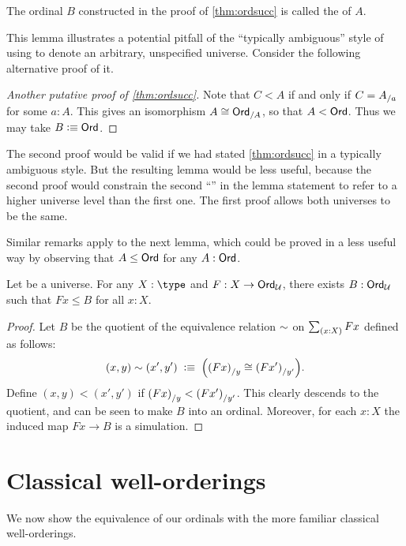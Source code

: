 The ordinal $B$ constructed in the proof of \cref{thm:ordsucc} is called the  of $A$.

This lemma illustrates a potential pitfall of the ``typically ambiguous'' style of using \UU to denote an arbitrary, unspecified universe.
Consider the following alternative proof of it.

\begin{proof}[Another putative proof of \cref{thm:ordsucc}]
  Note that $C<A$ if and only if $C={A}_{/a}$ for some $a:A$.
  This gives an isomorphism $A \cong {\ensuremath{\mathsf{Ord}}}_{/A}$, so that $A<\mathsf{Ord}$.
  Thus we may take $B\vcentcolon\equiv\mathsf{Ord}$.
\end{proof}

The second proof would be valid if we had stated \cref{thm:ordsucc} in a typically ambiguous style.
But the resulting lemma would be less useful, because the second proof would constrain the second ``\ord'' in the lemma statement to refer to a higher universe level than the first one.
The first proof allows both universes to be the same.

Similar remarks apply to the next lemma, which could be proved in a less useful way by observing that $A\le \mathsf{Ord}$ for any $A:\mathsf{Ord}$.

\begin{lem}\label{thm:ordunion}
  Let \bbU be a universe.
  For any $X:\type$ and $F:X\to \mathsf{Ord}_\mathcal{U}$, there exists $B:\mathsf{Ord}_\mathcal{U}$ such that $Fx\le B$ for all $x:X$.
\end{lem}
\begin{proof}
  Let $B$ be the quotient of the equivalence relation $\sim$ on $\sm{x:X} Fx$ defined as follows:
  \[ (x,y) \sim (x',y')
  \;\vcentcolon\equiv\;
  \Big({(Fx)}_{/y} \cong {(Fx')}_{/y'}\Big).
  \]
  Define $(x,y)<(x',y')$ if ${(Fx)}_{/y} < {(Fx')}_{/y'}$.
  This clearly descends to the quotient, and can be seen to make $B$ into an ordinal.
  Moreover, for each $x:X$ the induced map $Fx\to B$ is a simulation.
\end{proof}



\section{Classical well-orderings}
\label{sec:wellorderings}

%
We now show the equivalence of our ordinals with the more familiar classical well-orderings.

